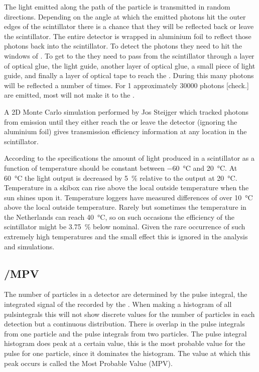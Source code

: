 The light emitted along the path of the particle is transmitted in random directions. Depending on the angle at which the emitted photons hit the outer edges of the scintillator there is a chance that they will be reflected back or leave the scintillator. The entire detector is wrapped in aluminium foil to reflect those photons back into the scintillator. To detect the photons they need to hit the windows of \pmt. To get to the \pmt they need to pass from the scintillator through a layer of optical glue, the light guide, another layer of optical glue, a small piece of light guide, and finally a layer of optical tape to reach the \pmt. During this many photons will be reflected a number of times. For \SI{1}{\mip} approximately 30000 photons [check.] are emitted, most will not make it to the \pmt.

A 2D Monte Carlo simulation performed by Jos Steijger which tracked photons from emission until they either reach the \pmt or leave the detector (ignoring the aluminium foil) gives transmission efficiency information at any location in the scintillator.

According to the specifications the amount of light produced in a scintillator as a function of temperature should be constant between \SI{-60}{\degreeCelsius} and \SI{20}{\degreeCelsius}. At \SI{60}{\degreeCelsius} the light output is decreased by \SI{5}{\percent} relative to the output at \SI{20}{\degreeCelsius}. Temperature in a skibox can rise above the local outside temperature when the sun shines upon it. Temperature loggers have measured differences of over \SI{10}{\degreeCelsius} above the local outside temperature. Rarely but sometimes the temperature in the Netherlands can reach \SI{40}{\degreeCelsius}, so on such occasions the efficiency of the scintillator might be \SI{3.75}{\percent} below nominal. Given the rare occurrence of such extremely high temperatures and the small effect this is ignored in the analysis and simulations.


\subsection{\mip/MPV}

The number of particles in a detector are determined by the pulse integral, the integrated signal of the \pmt recorded by the \adc. When making a histogram of all pulsintegrals this will not show discrete values for the number of particles in each detection but a continuous distribution. There is overlap in the pulse integrals from one particle and the pulse integrals from two particles. The pulse integral histogram does peak at a certain value, this is the most probable value for the pulse for one particle, since it dominates the histogram. The value at which this peak occurs is called the Most Probable Value (MPV).


